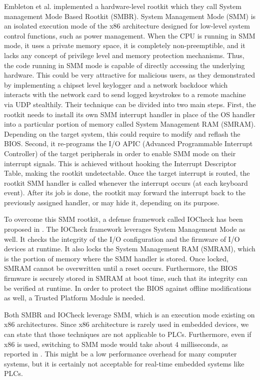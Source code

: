 Embleton et al. \cite{smm-rootkit} implemented a hardware-level rootkit which they call System management Mode Based Rootkit (SMBR).
System Management Mode (SMM) is an isolated execution mode of the x86 architecture designed for low-level system control functions, such as power management.
When the CPU is running in SMM mode, it uses a private memory space, it is completely non-preemptible, and it lacks any concept of privilege level
and memory protection mechanisms. Thus, the code running in SMM mode is capable of directly accessing the underlying hardware.
This could be very attractive for malicious users, as they demonstrated by implementing a chipset level keylogger and a network backdoor
which interacts with the network card to send logged keystrokes to a remote machine via UDP stealthily.
Their technique can be divided into two main steps. First, the rootkit needs to install its own SMM interrupt handler in place of the OS handler into a
particular portion of memory called System Management RAM (SMRAM). Depending on the target system, this could require to modify and reflash the BIOS.
Second, it re-programs the I/O APIC (Advanced Programmable Interrupt Controller) of the target peripherals in order to enable SMM mode on their interrupt signals.
This is achieved without hooking the Interrupt Descriptor Table, making the rootkit undetectable.
Once the target interrupt is routed, the rootkit SMM handler is called whenever the interrupt occurs (\eg at each keyboard event).
After its job is done, the rootkit may forward the interrupt back to the previously assigned handler, or may hide it, depending on its purpose.

To overcome this SMM rootkit, a defense framework called IOCheck has been proposed in \cite{iocheck}.
The IOCheck framework leverages System Management Mode as well. It checks the integrity of the I/O configuration and the firmware of I/O devices at runtime.
It also locks the System Management RAM (SMRAM), which is the portion of memory where the SMM handler is stored. Once locked, SMRAM cannot be overwritten until a reset occurs.
Furthermore, the BIOS firmware is securely stored in SMRAM at boot time, such that its integrity can be verified at runtime.
In order to protect the BIOS against offline modifications as well, a Trusted Platform Module is needed.

Both SMBR and IOCheck leverage SMM, which is an execution mode existing on x86 architectures.
Since x86 architecture is rarely used in embedded devices, we can state that those techniques are not applicable to PLCs.
Furthermore, even if x86 is used, switching to SMM mode would take about 4 milliseconds, as reported in \cite{iocheck}.
This might be a low performance overhead for many computer systems, but it is certainly not acceptable for real-time embedded systems like PLCs.
